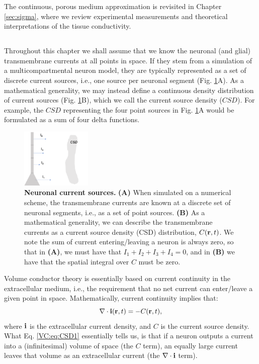 The continuous, porous medium approximation is revisited in Chapter \ref{sec:sigma}, where we review experimental measurements and theoretical interpretations of the tissue conductivity.


\subsection{}
\label{sec:VC:main}
Throughout this chapter we shall assume that we know the neuronal (and glial) transmembrane currents at all points in space. If they stem from a simulation of a multicompartmental neuron model, they are typically represented as a set of discrete current sources, i.e., one source per neuronal segment (Fig. \ref{VC:fig:CSD}A). As a mathematical generality, we may instead define a continuous density distribution of current sources (Fig. \ref{VC:fig:CSD}B), which we call the current source density ($CSD$). For example, the $CSD$ representing the four point sources in Fig. \ref{VC:fig:CSD}A would be formulated as a sum of four delta functions. 

\begin{figure}[!ht]
\begin{center}
\includegraphics[width=0.3\textwidth]{Figures/VC/CSD.png}
\end{center}
\caption{\textbf{Neuronal current sources.}  {\bf (A)} When simulated on a numerical scheme, the transmembrane currents are known at a discrete set of neuronal segments, i.e., as a set of point sources.  {\bf (B)} As a mathematical generality, we can describe the transmembrane currents as a current source density (CSD) distribution, $C({\bf r},t)$. We note the sum of current entering/leaving a neuron is always zero, so that in {\bf (A)}, we must have that $I_1 + I_2 + I_3 + I_4 = 0$, and in {\bf (B)} we have that the spatial integral over $C$ must be zero.
}
\label{VC:fig:CSD}
\end{figure}
Volume conductor theory is essentially based on current continuity in the extracellular medium, i.e., the requirement that no net current can enter/leave a given point in space. Mathematically, current continuity implies that:
\begin{equation}
\nabla \cdot {\bf i}({\bf r}, t) = - C({\bf r}, t),
\label{VC:eq:CSD1}
\end{equation}
where ${\bf i}$ is the extracellular current density, and $C$ is the current source density. What Eq. \ref{VC:eq:CSD1} essentially tells us, is that if a neuron outputs a current into a (infinitesimal) volume of space (the $C$ term), an equally large current leaves that volume as an extracellular current (the $\nabla \cdot {\bf i}$ term).

